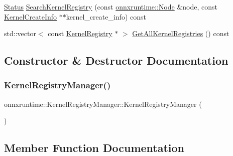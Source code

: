 \begin{DoxyCompactItemize}
\item 
\mbox{\hyperlink{classonnxruntime_1_1common_1_1Status}{Status}} \mbox{\hyperlink{classonnxruntime_1_1KernelRegistryManager_a377a661b24ec010403b2ce431d5f3e8c}{Search\+Kernel\+Registry}} (const \mbox{\hyperlink{classonnxruntime_1_1Node}{onnxruntime\+::\+Node}} \&node, const \mbox{\hyperlink{structonnxruntime_1_1KernelCreateInfo}{Kernel\+Create\+Info}} $\ast$$\ast$kernel\+\_\+create\+\_\+info) const
\item 
std\+::vector$<$ const \mbox{\hyperlink{classonnxruntime_1_1KernelRegistry}{Kernel\+Registry}} $\ast$ $>$ \mbox{\hyperlink{classonnxruntime_1_1KernelRegistryManager_a9f1e5dfe5920cfce9b6f2507e37c3812}{Get\+All\+Kernel\+Registries}} () const
\end{DoxyCompactItemize}


\subsection{Constructor \& Destructor Documentation}
\mbox{\label{classonnxruntime_1_1KernelRegistryManager_a94f8cccaf59a0a6a791531fcd8fadd61}} 
\subsubsection{\texorpdfstring{Kernel\+Registry\+Manager()}{KernelRegistryManager()}}
{\footnotesize\ttfamily onnxruntime\+::\+Kernel\+Registry\+Manager\+::\+Kernel\+Registry\+Manager (\begin{DoxyParamCaption}{ }\end{DoxyParamCaption})\hspace{0.3cm}{\ttfamily [default]}}



\subsection{Member Function Documentation}
\mbox{\label{classonnxruntime_1_1KernelRegistryManager_af32cb698da68c2c1fdb1da2256e5156c}} 
